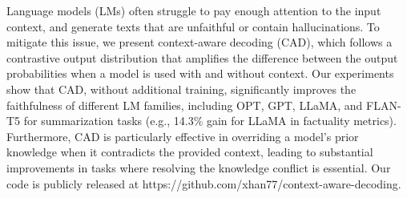 Language models (LMs) often struggle to pay enough attention to the input context, and generate texts that are unfaithful or contain hallucinations. To mitigate this issue, we present context-aware decoding (CAD), which follows a contrastive output distribution that amplifies the difference between the output probabilities when a model is used with and without context. Our experiments show that CAD, without additional training, significantly improves the faithfulness of different LM families, including OPT, GPT, LLaMA, and FLAN-T5 for summarization tasks (e.g., 14.3\% gain for LLaMA in factuality metrics). Furthermore, CAD is particularly effective in overriding a model’s prior knowledge when it contradicts the provided context, leading to substantial improvements in tasks where resolving the knowledge conflict is essential. Our code is publicly released at https://github.com/xhan77/context-aware-decoding.